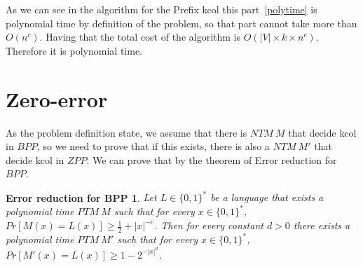 \documentclass[12pt, a4paper]{article}
\begin{document}
As we can see in the algorithm for the Prefix \acrshort{kcol} this part~\ref{polytime} is polynomial time by definition of the problem, so that part cannot take more than $O(n^c)$. Having that the total cost of the algorithm is $O(|V| \times k \times n^c)$. Therefore it is polynomial time.

\section{Zero-error}
As the problem definition state, we assume that there is $NTM\ M$ that decide \acrshort{kcol} in $BPP$, so we need to prove that if this exists, there is also a $NTM\ M'$ that decide \acrshort{kcol} in $ZPP$. We can prove that by the theorem of Error reduction for $BPP$.

\newtheorem{bpperror}{Error reduction for BPP}\label{bpp:error}
\begin{bpperror}
  Let $L \in \{0,1\}^*$ be a language that exists a polynomial time $PTM\ M$ such that for every $x \in \{0,1\}^*$, $Pr[M(x)=L(x)] \geq \frac{1}{2} + |x|^{-c}$.
  Then for every constant $d > 0$ there exists a polynomial time $PTM\ M'$ such that for every $x \in \{0,1\}^*$, $Pr[M'(x)=L(x)] \geq 1 - 2^{-|x|^d}$.
\end{bpperror}
\end{document}
